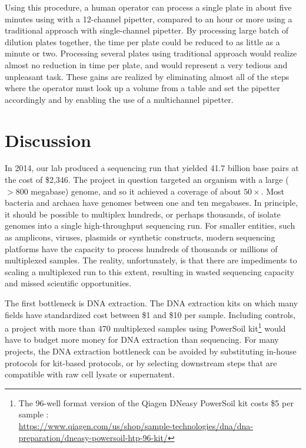 \begin{refsection}
Using this procedure, a human operator can process a single plate in about five minutes using with a 12-channel pipetter, compared to an hour or more using a traditional approach with single-channel pipetter. By processing large batch of dilution plates together, the time per plate could be reduced to as little as a minute or two. Processing several plates using traditional approach would realize almost no reduction in time per plate, and would represent a very tedious and unpleasant task. These gains are realized by eliminating almost all of the steps where the operator must look up a volume from a table and set the pipetter accordingly and by enabling the use of a multichannel pipetter.

\section{Discussion}

In 2014, our lab produced a sequencing run that yielded 41.7 billion base pairs at the cost of \$2,346. The project in question targeted an organism with a large ($>800$ megabase) genome, and so it achieved a coverage of about $50\times$. Most bacteria and archaea have genomes between one and ten megabases. In principle, it should be possible to multiplex hundreds, or perhaps thousands, of isolate genomes into a single high-throughput sequencing run. For smaller entities, such as amplicons, viruses, plasmids or synthetic constructs, modern sequencing platforms have the capacity to process hundreds of thousands or millions of multiplexed samples. The reality, unfortunately, is that there are impediments to scaling a multiplexed run to this extent, resulting in wasted sequencing capacity and missed scientific opportunities.

The first bottleneck is DNA extraction. The DNA extraction kits on which many fields have standardized cost between \$1 and \$10 per sample. Including controls, a project with more than 470 multiplexed samples using PowerSoil kit\footnote{The 96-well format version of the Qiagen DNeasy PowerSoil kit costs \$5 per sample :\\ \url{https://www.qiagen.com/us/shop/sample-technologies/dna/dna-preparation/dneasy-powersoil-htp-96-kit/}} would have to budget more money for DNA extraction than sequencing. For many projects, the DNA extraction bottleneck can be avoided by substituting in-house protocols for kit-based protocols, or by selecting downstream steps that are compatible with raw cell lysate or supernatent.


\end{refsection}
